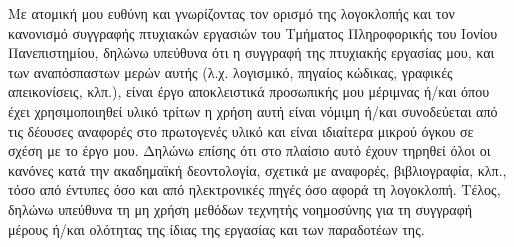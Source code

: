 Με ατομική μου ευθύνη και γνωρίζοντας τον ορισμό της λογοκλοπής και τον κανονισμό συγγραφής πτυχιακών εργασιών του Τμήματος Πληροφορικής του Ιονίου Πανεπιστημίου, δηλώνω υπεύθυνα ότι η
συγγραφή της πτυχιακής εργασίας μου, και των αναπόσπαστων μερών αυτής (λ.χ. λογισμικό, πηγαίος κώδικας, γραφικές απεικονίσεις, κλπ.), είναι έργο αποκλειστικά προσωπικής μου μέριμνας ή/και όπου έχει χρησιμοποιηθεί υλικό τρίτων η χρήση αυτή είναι νόμιμη ή/και συνοδεύεται από τις δέουσες αναφορές στο πρωτογενές υλικό και είναι ιδιαίτερα μικρού όγκου σε σχέση με το έργο μου. Δηλώνω επίσης ότι στο πλαίσιο αυτό έχουν τηρηθεί όλοι οι κανόνες κατά την ακαδημαϊκή δεοντολογία, σχετικά με αναφορές, βιβλιογραφία,
κλπ., τόσο από έντυπες όσο και από ηλεκτρονικές πηγές όσο αφορά τη λογοκλοπή. Τέλος, δηλώνω υπεύθυνα τη μη χρήση μεθόδων τεχνητής νοημοσύνης για τη συγγραφή μέρους ή/και ολότητας της ίδιας της εργασίας και των παραδοτέων της.